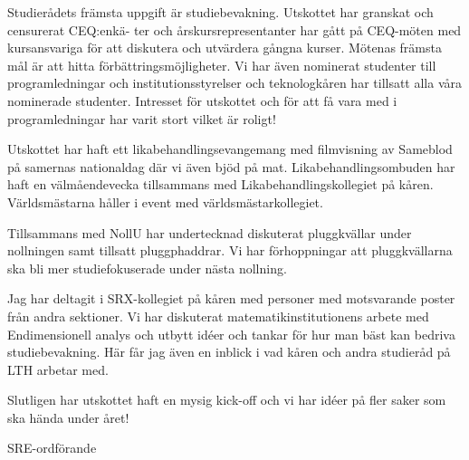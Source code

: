 \documentclass[../_main/handlingar.tex]{subfiles}
\begin{document}
Studierådets främsta uppgift är studiebevakning. Utskottet har granskat och censurerat CEQ:enkä- ter och årskursrepresentanter har gått på CEQ-möten med kursansvariga för att diskutera och utvärdera gångna kurser. Mötenas främsta mål är att hitta förbättringsmöjligheter. Vi har även nominerat studenter till programledningar och institutionsstyrelser och teknologkåren har tillsatt alla våra nominerade studenter. Intresset för utskottet och för att få vara med i programledningar har varit stort vilket är roligt!

Utskottet har haft ett likabehandlingsevangemang med filmvisning av Sameblod på samernas nationaldag där vi även bjöd på mat. Likabehandlingsombuden har haft en välmåendevecka tillsammans med Likabehandlingskollegiet på kåren. Världsmästarna håller i event med världsmästarkollegiet.

Tillsammans med NollU har undertecknad diskuterat pluggkvällar under nollningen samt tillsatt pluggphaddrar. Vi har förhoppningar att pluggkvällarna ska bli mer studiefokuserade under nästa nollning.

Jag har deltagit i SRX-kollegiet på kåren med personer med motsvarande poster från andra sektioner. Vi har diskuterat matematikinstitutionens arbete med Endimensionell analys och utbytt idéer och tankar för hur man bäst kan bedriva studiebevakning. Här får jag även en inblick i vad kåren och andra studieråd på LTH arbetar med.

Slutligen har utskottet haft en mysig kick-off och vi har idéer på fler saker som ska hända under året!
\begin{signatures}{1}
    \mvh
    \signature{Fanny Månefjord}{SRE-ordförande}
\end{signatures}
\end{document}
